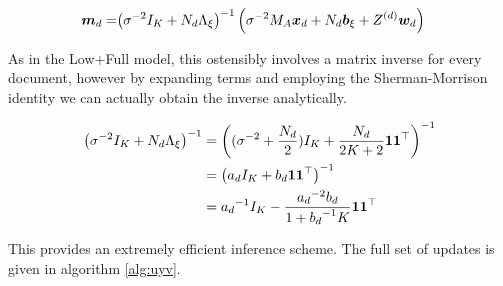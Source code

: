 \begin{align}
\bm m_d = & {\left( \sigma^{-2}I_K + N_d { \Lambda_{\xi} } \right)}^{-1} \left(\sigma^{-2} M_A { \bm x_d }  + N_d { \bm b_{\xi} } + Z^{(d)}\bm w_d \right )
\end{align}

As in the Low+Full model, this ostensibly involves a matrix inverse for every document, however by expanding terms and employing the Sherman-Morrison identity we can actually obtain the inverse analytically.

\begin{align}
{\left( \sigma^{-2}I_K + N_d  { \Lambda_{\xi} } \right)}^{-1}
& = {\left( (\sigma^{-2} + \frac{N_d}{2})I_K + \frac{N_d}{2K + 2} \mathbf{1} \mathbf{1}^\top \right)}^{-1} \\
& = {\left( a_d I_K + b_d \mathbf{1}\mathbf{1}^\top \right)}^{-1} \\
& = {a_d}^{-1} I_K - \frac{{a_d}^{-2}b_d }{1 + {b_d}^{-1}K}\mathbf{1}\mathbf{1}^\top
\end{align}

This provides an extremely efficient inference scheme. The full set of updates is given in algorithm \ref{alg:uyv}.

\newcommand \mvy  { \vv{m}_{\vv{y}} }
\newcommand \sigvy { { S_Y } }

\newcommand \mmy  { M_Y      }
\newcommand \omy  { \Omega_Y }
\newcommand \sigy { \Sigma_Y }

